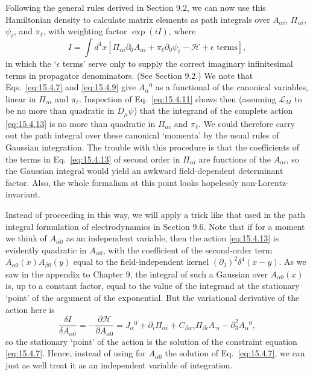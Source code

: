 Following the general rules derived in Section 9.2, we can now use this
Hamiltonian density to calculate matrix elements as path integrals over
$A_{\alpha i}$, $\Pi_{\alpha i}$, $\psi_\ell$, and $\pi_\ell$, with weighting
factor $\exp(iI)$, where
\begin{equation}
  I=\int d^4x\left[\Pi_{\alpha i}\partial_0A_{\alpha i}
  +\pi_\ell\partial_0\psi_\ell-\mathcal H+\epsilon\text{ terms}\right],
  \tag{15.4.13}\label{eq:15.4.13}
\end{equation}
in which the `$\epsilon$ terms' serve only to supply the correct imaginary
infinitesimal terms in propagator denominators. (See Section 9.2.) We note that
Eqs.~\eqref{eq:15.4.7} and \eqref{eq:15.4.9} give $A_\alpha{}^0$ as a
functional of the canonical variables, linear in $\Pi_{\alpha i}$ and
$\pi_\ell$. Inspection of Eq.~\eqref{eq:15.4.11} shows then (assuming
$\mathcal L_M$ to be no more than quadratic in $D_\mu\psi$) that the integrand
of the complete action \eqref{eq:15.4.13} is no more than quadratic in
$\Pi_{\alpha i}$ and $\pi_\ell$. We could therefore carry out the path
integral over these canonical `momenta' by the usual rules of Gaussian
integration. The trouble with this procedure is that the coefficients of the
terms in Eq.~\eqref{eq:15.4.13} of second order in $\Pi_{\alpha i}$ are
functions of the $A_{\alpha i}$, so the Gaussian integral would yield an
awkward field-dependent determinant factor. Also, the whole formalism at this
point looks hopelessly non-Lorentz-invariant.

Instead of proceeding in this way, we will apply a trick like that used in the
path integral formulation of electrodynamics in Section 9.6. Note that if for
a moment we think of $A_{\alpha0}$ as an independent variable, then the action
\eqref{eq:15.4.13} is evidently quadratic in $A_{\alpha0}$, with the
coefficient of the second-order term $A_{\alpha0}(x)A_{\beta0}(y)$ equal to the
field-independent kernel $(\partial_3)^2\delta^4(x-y)$. As we saw in the
appendix to Chapter 9, the integral of such a Gaussian over $A_{\alpha0}(x)$
is, up to a constant factor, equal to the value of the integrand at the
stationary `point' of the argument of the exponential. But the variational
derivative of the action here is
\begin{equation*}
  \frac{\delta I}{\delta A_{\alpha0}}
  =-\frac{\partial\mathcal H}{\partial A_{\alpha0}}
  =J_\alpha{}^0+\partial_i\Pi_{\alpha i}
  +C_{\beta\alpha\gamma}\Pi_{\beta i}A_{\gamma i}
  -\partial_3^2A_\alpha{}^0,
\end{equation*}
so the stationary `point' of the action is the solution of the constraint
equation \eqref{eq:15.4.7}. Hence, instead of using for $A_{\alpha0}$ the
solution of Eq.~\eqref{eq:15.4.7}, we can just as well treat it as an
independent variable of integration.


